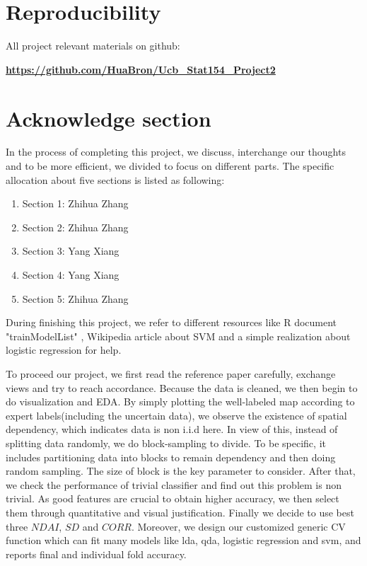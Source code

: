 \documentclass[11pt]{article}
\begin{document}
\section{Reproducibility}

\qquad \; All project relevant materials on github:\par
\quad \href{https://github.com/HuaBron/Ucb_Stat154_Project2}{\textbf{https://github.com/HuaBron/Ucb\_Stat154\_Project2}}

\newpage

\section*{Acknowledge section}
\quad In the process of completing this project, we discuss, interchange our thoughts and to be more efficient, we divided to focus on different parts. The specific allocation about five sections is listed as following:
\begin{enumerate}
	\item[] Section 1: Zhihua Zhang
	\item[] Section 2: Zhihua Zhang
	\item[] Section 3: Yang Xiang
	\item[] Section 4: Yang Xiang
	\item[] Section 5: Zhihua Zhang
\end{enumerate}
\quad During finishing this project, we refer to different resources like R document "trainModelList" \cite{RtrainModelList}, Wikipedia article about SVM \cite{SVMwiki} and a simple realization about logistic regression \cite{LogisticExample} for help.\par
\quad To proceed our project, we first read the reference paper carefully, exchange views and try to reach accordance. Because the data is cleaned, we then begin to do visualization and EDA. By simply plotting the well-labeled map according to expert labels(including the uncertain data), we observe the existence of spatial dependency, which indicates data is non i.i.d here. In view of this, instead of splitting data randomly, we do block-sampling to divide. To be specific, it includes partitioning data into blocks to remain dependency and then doing random sampling. The size of block is the key parameter to consider. After that, we check the performance of trivial classifier and find out this problem is non trivial. As good features are crucial to obtain higher accuracy, we then select them through quantitative and visual justification. Finally we decide to use best three $NDAI$, $SD$ and $CORR$. Moreover, we design our customized generic CV function which can fit many models like lda, qda, logistic regression and svm, and reports final and individual fold accuracy.\par
\end{document}
